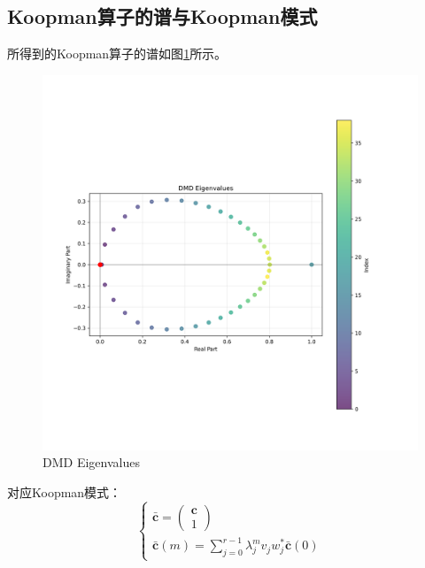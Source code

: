 \documentclass[11pt,a4 paper,one side]{article}
\begin{document}
\subsection{Koopman算子的谱与Koopman模式}
所得到的Koopman算子的谱如图\ref{DMD Eigenvalues}所示。\begin{figure}[htbp]
    \centering
    \includegraphics[width=\textwidth]{DMD Eigenvalues.png}
        \caption{DMD Eigenvalues}
        \label{DMD Eigenvalues}
\end{figure}
对应Koopman模式：\begin{equation}
    \begin{cases}
        \bar{\mathbf{c}} = \begin{pmatrix}
            \mathbf{c} \\ 1
        \end{pmatrix}
        \\
        \bar{\mathbf{c}}(m) = \sum_{j=0}^{r-1}\lambda_j^m v_j w_j^* \bar{\mathbf{c}}(0)
    \end{cases}
\end{equation}
\end{document}
